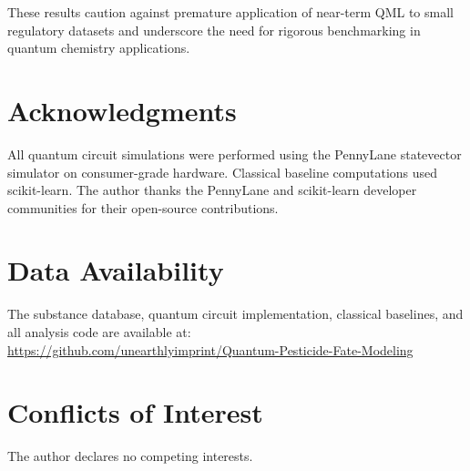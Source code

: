 \documentclass[12pt,a4paper]{article}
\begin{document}
These results caution against premature application of near-term QML to
small regulatory datasets and underscore the need for rigorous benchmarking
in quantum chemistry applications.


\section*{Acknowledgments}

All quantum circuit simulations were performed using the PennyLane
statevector simulator on consumer-grade hardware. Classical baseline
computations used scikit-learn. The author thanks the PennyLane and
scikit-learn developer communities for their open-source contributions.


\section*{Data Availability}

The substance database, quantum circuit implementation, classical baselines,
and all analysis code are available at:\\
\url{https://github.com/unearthlyimprint/Quantum-Pesticide-Fate-Modeling}


\section*{Conflicts of Interest}

The author declares no competing interests.




\end{document}
